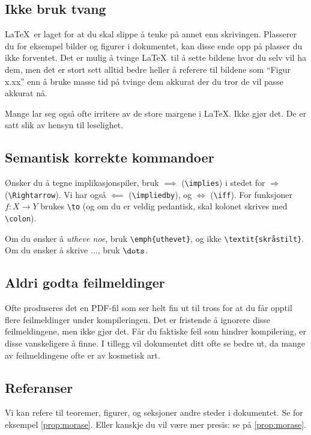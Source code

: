 \documentclass[a4paper, norsk]{article}  %
\begin{document}
\subsection{Ikke bruk tvang}

\LaTeX\ er laget for at du skal slippe å tenke på annet enn skrivingen. Plasserer du for eksempel bilder og figurer i dokumentet, kan disse ende opp på plasser du ikke forventet. Det er mulig å tvinge \LaTeX\ til å sette bildene hvor du selv vil ha dem, men det er stort sett alltid bedre heller å referere til bildene som ``Figur x.xx'' enn å bruke masse tid på tvinge dem akkurat der du tror de vil passe akkurat nå.

Mange lar seg også ofte irritere av de store margene i \LaTeX. Ikke gjør det. De er satt slik av hensyn til leselighet.

\subsection{Semantisk korrekte kommandoer}

Ønsker du å tegne implikasjonspiler, bruk $\implies$ (\verb|\implies|) i stedet for $\Rightarrow$ (\verb|\Rightarrow|). Vi har også $\impliedby$ (\verb|\impliedby|), og $\iff$ (\verb|\iff|). For funksjoner $f\colon X \to Y$ brukes \verb|\to| (og om du er veldig pedantisk, skal kolonet skrives med \verb|\colon|).

Om du ønsker å \emph{utheve noe}, bruk \verb|\emph{uthevet}|, og ikke \verb|\textit{skråstilt}|. Om du ønsker å skrive $\dots$, bruk $\verb|\dots|$.

\subsection{Aldri godta feilmeldinger}

Ofte produseres det en PDF-fil som ser helt fin ut til tross for at du får opptil flere feilmeldinger under kompileringen. Det er fristende å ignorere disse feilmeldingene, men ikke gjør det. Får du faktiske feil som hindrer kompilering, er disse vanskeligere å finne. I tillegg vil dokumentet ditt ofte se bedre ut, da mange av feilmeldingene ofte er av kosmetisk art.

\subsection{Referanser}

Vi kan refere til teoremer, figurer, og seksjoner andre steder i dokumentet. Se for eksempel \cref{prop:morase}. Eller kanskje du vil være mer presis: se på \vref{prop:morase}.
\end{document}
